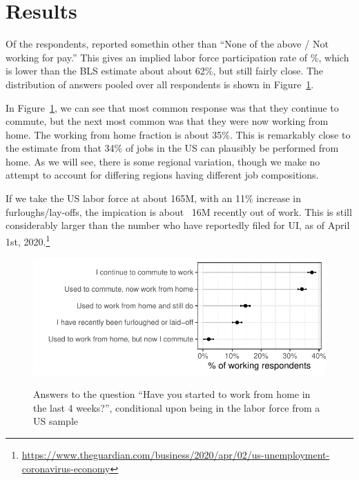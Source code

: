 \documentclass[12pt]{article}
\begin{document}
\section{Results}

Of the respondents, \numObsWorking{} reported somethin other than ``None of the above / Not working for pay.''
This gives an implied labor force participation rate of \LFPRhat{}\%, which is lower than the BLS estimate about about 62\%, but still fairly close.
The distribution of answers pooled over all respondents is shown in Figure~\ref{fig:working_summary}. 

In Figure~\ref{fig:working_summary}, we can see that most common response was that they continue to commute, but the next most common was that they were now working from home. 
The working from home fraction is about 35\%. 
This is remarkably close to the estimate from \cite{dingel2020} that 34\% of jobs in the US can plausibly be performed from home.
As we will see, there is some regional variation, though we make no attempt to account for differing regions having different job compositions.

If we take the US labor force at about 165M, with an 11\% increase in furloughs/lay-offs, the impication is about ~16M recently out of work.
This is still considerably larger than the number who have reportedly filed for UI, as of April 1st, 2020.\footnote{
  \url{https://www.theguardian.com/business/2020/apr/02/us-unemployment-coronavirus-economy}
}


\begin{figure}
  \caption{Answers to the question ``Have you started to work from home in the last 4 weeks?'', conditional upon being in the labor force from a US sample} \label{fig:working_summary}
\centering
\begin{minipage}{1.0 \linewidth}
  \includegraphics[width = \linewidth]{plots/working_summary.pdf} \\
  \begin{footnotesize}
    \end{footnotesize}
\end{minipage}
\end{figure} 
\end{document}
